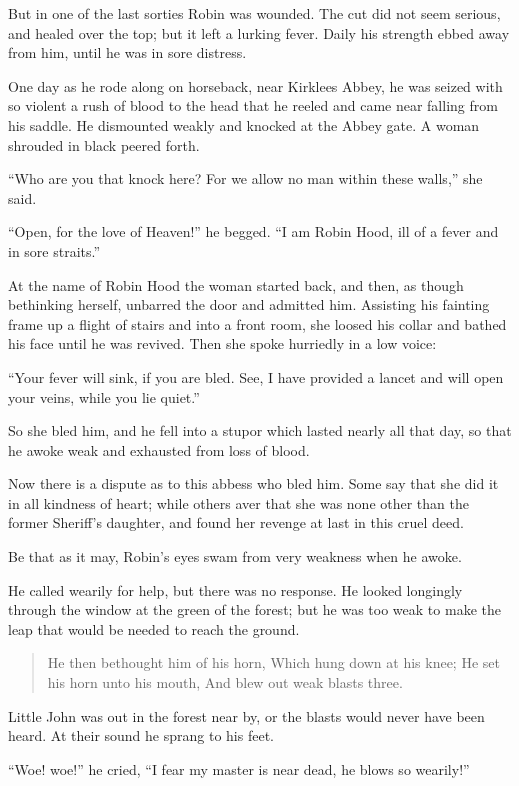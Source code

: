 But in one of the last sorties Robin was wounded. The cut did not seem
serious, and healed over the top; but it left a lurking fever. Daily his
strength ebbed away from him, until he was in sore distress.

One day as he rode along on horseback, near Kirklees Abbey, he was
seized with so violent a rush of blood to the head that he reeled and
came near falling from his saddle. He dismounted weakly and knocked at
the Abbey gate. A woman shrouded in black peered forth.

``Who are you that knock here? For we allow no man within these walls,''
she said.

``Open, for the love of Heaven!'' he begged. ``I am Robin Hood, ill of a
fever and in sore straits.''

At the name of Robin Hood the woman started back, and then, as though
bethinking herself, unbarred the door and admitted him. Assisting his
fainting frame up a flight of stairs and into a front room, she loosed
his collar and bathed his face until he was revived. Then she spoke
hurriedly in a low voice:

``Your fever will sink, if you are bled. See, I have provided a lancet
and will open your veins, while you lie quiet.''

So she bled him, and he fell into a stupor which lasted nearly all that
day, so that he awoke weak and exhausted from loss of blood.

Now there is a dispute as to this abbess who bled him. Some say that she
did it in all kindness of heart; while others aver that she was none
other than the former Sheriff's daughter, and found her revenge at last
in this cruel deed.

Be that as it may, Robin's eyes swam from very weakness when he awoke.

He called wearily for help, but there was no response. He looked
longingly through the window at the green of the forest; but he was too
weak to make the leap that would be needed to reach the ground.

\begin{quote}
He then bethought him of his horn,
Which hung down at his knee;
He set his horn unto his mouth,
And blew out weak blasts three.
\end{quote}

Little John was out in the forest near by, or the blasts would never
have been heard. At their sound he sprang to his feet.

``Woe! woe!'' he cried, ``I fear my master is near dead, he blows so
wearily!''

